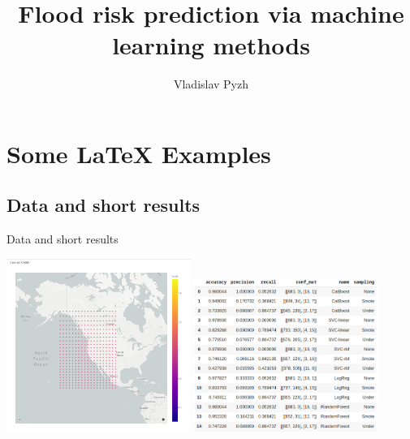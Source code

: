 \documentclass{beamer}
\title[Your Short Title]{Flood risk prediction via machine learning methods}
\author{Vladislav Pyzh}
\institute{MIPT}
\date{}
\begin{document}
\begin{frame}
  \titlepage
\end{frame}


\section{Some \LaTeX{} Examples}

\subsection{Data and short results}

\begin{frame}{Data and short results}



\includegraphics[width=0.45\textwidth]{map.png}
\hfill
\includegraphics[width=0.45\textwidth]{pivot_table.png}

\end{frame}
\end{document}
